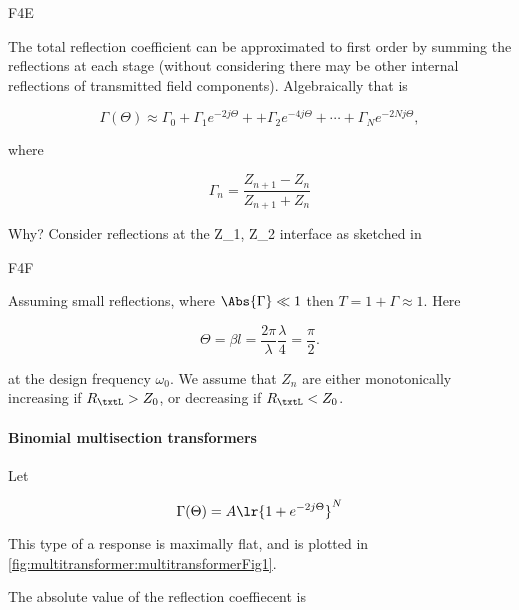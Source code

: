 F4E

The total reflection coefficient can be approximated to first order by summing the reflections at each stage (without considering there may be other internal reflections of transmitted field components).  Algebraically that is

\begin{equation}\label{eqn:uwavesDeck7MultisectionTransformersCore:60}
\Gamma(\Theta) \approx \Gamma_0 
+ \Gamma_1 e^{-2 j \Theta} + 
+ \Gamma_2 e^{-4 j \Theta} +  \cdots
+ \Gamma_N e^{-2 N j \Theta},
\end{equation}

where

\begin{equation}\label{eqn:uwavesDeck7MultisectionTransformersCore:80}
\Gamma_n = \frac{Z_{n+1} - Z_n}{Z_{n+1} + Z_n}
\end{equation}

Why?  Consider reflections at the Z_1, Z_2 interface as sketched in

F4F

Assuming small reflections, where \( \Abs{\Gamma} \ll 1 \) then \( T = 1 + \Gamma \approx 1 \).  Here

\begin{dmath}\label{eqn:uwavesDeck7MultisectionTransformersCore:100}
\Theta 
= \beta l 
= \frac{2 \pi}{\lambda} \frac{\lambda}{4} 
= \frac{\pi}{2}.
\end{dmath}

at the design frequency \( \omega_0 \).  We assume that \( Z_n \) are either monotonically increasing if \( R_\txtL > Z_0 \), or decreasing if \( R_\txtL < Z_0 \).

\paragraph{Binomial multisection transformers}

Let

\begin{equation}\label{eqn:uwavesDeck7MultisectionTransformersCore:120}
\Gamma(\Theta) = A \lr{ 1 + e^{-2 j \Theta} }^N
\end{equation}

This type of a response is maximally flat, and is plotted in \cref{fig:multitransformer:multitransformerFig1}.

The absolute value of the reflection coeffiecent is

